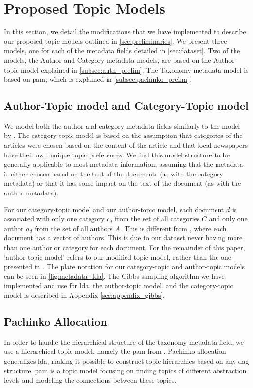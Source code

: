 \section{Proposed Topic Models}\label{sec:plate_notation}
In this section, we detail the modifications that we have implemented to describe our proposed topic models outlined in \autoref{sec:preliminaries}.
We present three models, one for each of the metadata fields detailed in \autoref{sec:dataset}.
Two of the models, the Author and Category metadata models, are based on the Author-topic model explained in \autoref{subsec:auth_prelim}.
The Taxonomy metadata model is based on \gls{pam}, which is explained in \autoref{subsec:pachinko_prelim}.

\subsection{Author-Topic model and Category-Topic model}
We model both the author and category metadata fields similarly to the model by \citet{author_topic_2012}.
The category-topic model is based on the assumption that categories of the articles were chosen based on the content of the article and that local newspapers have their own unique topic preferences.
We find this model structure to be generally applicable to most metadata information, assuming that the metadata is either chosen based on the text of the documents (as with the category metadata) or that it has some impact on the text of the document (as with the author metadata).

For our category-topic model and our author-topic model, each document $d$ is associated with only one category $c_d$ from the set of all categories $C$ and only one author $a_d$ from the set of all authors $A$.
This is different from \citet{author_topic_2012}, where each document has a vector of authors.
This is due to our dataset never having more than one author or category for each document.
For the remainder of this paper, 'author-topic model' refers to our modified topic model, rather than the one presented in \citet{author_topic_2012}.
The plate notation for our category-topic and author-topic models can be seen in \autoref{fig:metadata_lda}.
The Gibbs sampling algorithm we have implemented and use for \gls{lda}, the author-topic model, and the category-topic model is described in Appendix \autoref{sec:appendix_gibbs}.

\subsection{Pachinko Allocation}\label{subsec:pam}
In order to handle the hierarchical structure of the taxonomy metadata field, we use a hierarchical topic model, namely the \acrfull{pam} from \citet{li2006pachinko}.
Pachinko allocation generalizes \gls{lda}, making it possible to construct topic hierarchies based on any \gls{dag} structure.
\gls{pam} is a topic model focusing on finding topics of different abstraction levels and modeling the connections between these topics.

